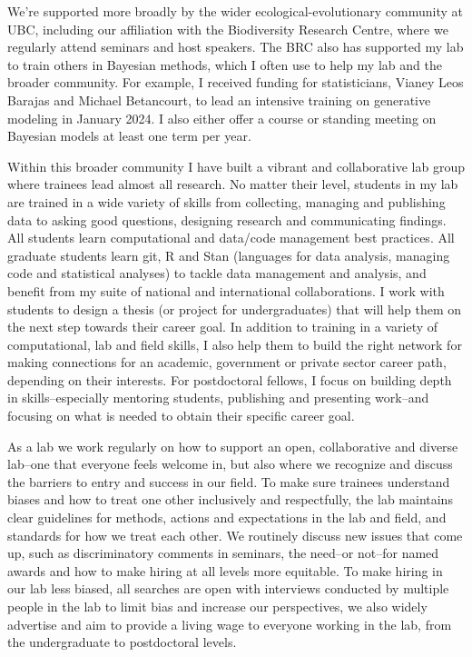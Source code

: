 \documentclass[12pt,oneside]{article}
\begin{document}
We're supported more broadly by the wider ecological-evolutionary community at UBC, including our affiliation with the Biodiversity Research Centre, where we regularly attend seminars and host speakers. The BRC also has supported my lab to train others in Bayesian methods, which I often use to help my lab and the broader community. For example, I received funding for statisticians, Vianey Leos Barajas and Michael Betancourt, to lead an intensive training on generative modeling in January 2024. I also either offer a course or standing meeting on Bayesian models at least one term per year.

Within this broader community I have built a vibrant and collaborative lab group where trainees lead almost all research. No matter their level, students in my lab are trained in a wide variety of skills from collecting, managing and publishing data to asking good questions, designing research and communicating findings. All students learn computational and data/code management best practices. All graduate students learn git, R and Stan (languages for data analysis, managing code and statistical analyses) to tackle data management and analysis, and benefit from my suite of national and international collaborations. I work with students to design a thesis (or project for undergraduates) that will help them on the next step towards their career goal. In addition to training in a variety of computational, lab and field skills, I also help them to build the right network for making connections for an academic, government or private sector career path, depending on their interests. For postdoctoral fellows, I focus on building depth in skills--especially mentoring students, publishing and presenting work--and focusing on what is needed to obtain their specific career goal.

As a lab we work regularly on how to support an open, collaborative and diverse lab--one that everyone feels welcome in, but also where we recognize and discuss the barriers to entry and success in our field. To make sure trainees understand biases and how to treat one other inclusively and respectfully, the lab maintains clear guidelines for methods, actions and expectations in the lab and field, and standards for how we treat each other. We routinely discuss new issues that come up, such as discriminatory comments in seminars, the need--or not--for named awards and how to make hiring at all levels more equitable. To make hiring in our lab less biased, all searches are open with interviews conducted by multiple people in the lab to limit bias and increase our perspectives, we also widely advertise and aim to provide a living wage to everyone working in the lab, from the undergraduate to postdoctoral levels. 
\end{document}
